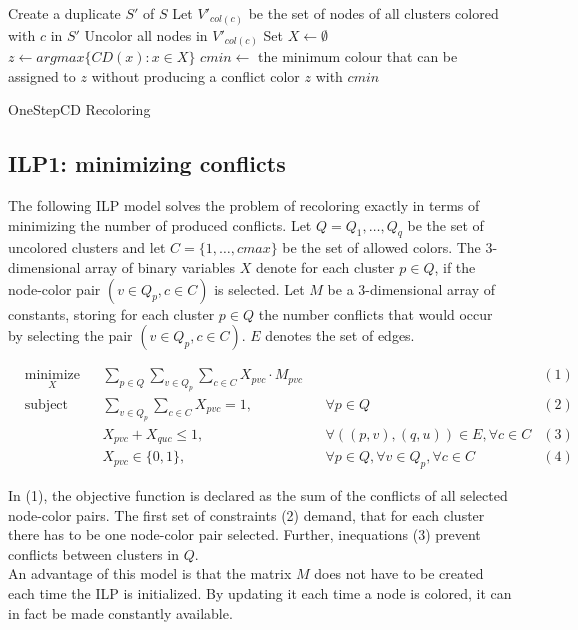 \begin{algorithm}[h]
Create a duplicate $S'$ of $S$\;
Let $V'_{col(c)}$ be the set of nodes of all clusters colored with $c$ in $S'$\;
Uncolor all nodes in $V'_{col(c)}$\;
 {
  Set $X \gets \emptyset $\;
  $z \gets argmax\{CD(x) : x \in X \}$\;
  $cmin \gets$ the minimum colour that can be assigned to $z$ without producing a conflict\;
  color $z$ with $cmin$\;
}
\;
\caption{OneStepCD Recoloring}
\label{algo:osdc2}
\end{algorithm}


\subsection{ILP1: minimizing conflicts}

The following ILP model solves the problem of recoloring exactly in terms of minimizing the number of produced conflicts. Let $Q = {Q_1,\ldots,Q_q}$ be the set of uncolored clusters and let $C=\{1,\ldots,cmax\}$ be the set of allowed colors. The 3-dimensional array of binary variables $X$ denote for each cluster $p \in Q$, if the node-color pair $(v \in Q_p, c \in C)$ is selected. Let $M$ be a 3-dimensional array of constants, storing for each cluster $p \in Q$ the number conflicts that would occur by selecting the pair $(v \in Q_p, c \in C)$. $E$ denotes the set of edges.

\begin{equation*}
\begin{aligned}
& \underset{X}{\text{minimize}} && \sum_{p \in Q}\sum_{v \in Q_p}\sum_{c \in C} X_{pvc} \cdot M_{pvc}                    &&&(1)\\
& \text{subject to} && \sum_{v \in Q_p}\sum_{c \in C} X_{pvc}=1, && \forall p \in Q    &(2)\\
&&& X_{pvc}+X_{quc} \leq 1, && \forall ((p,v),(q,u)) \in E, \forall c \in C     &(3)\\
&&& X_{pvc} \in \{0,1\}, && \forall p \in Q, \forall v \in Q_p, \forall c \in C         &(4)
\end{aligned}
\end{equation*}

In (1), the objective function is declared as the sum of the conflicts of all selected node-color pairs. The first set of constraints (2) demand, that for each cluster there has to be one node-color pair selected. Further, inequations (3) prevent conflicts between clusters in $Q$.\\
An advantage of this model is that the matrix $M$ does not have to be created each time the ILP is initialized. By updating it each time a node is colored, it can in fact be made constantly available.

